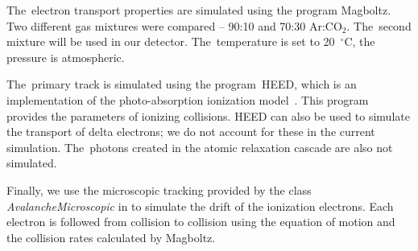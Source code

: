 		The~electron transport properties are simulated using the program Magboltz. Two different gas mixtures were compared -- 90:10 and 70:30 Ar:CO$_2$. The~second mixture will be used in our detector. The~temperature is set to 20~$^\circ$C, the pressure is atmospheric.
		
		The~primary track is simulated using the program~\ac{HEED}, which is an implementation of the photo-absorption ionization model~\cite{HEED}. This program provides the parameters of ionizing collisions. \ac{HEED} can also be used to simulate the transport of delta electrons; we do not account for these in the current simulation. The~photons created in the atomic relaxation cascade are also not simulated.
		
		Finally, we use the microscopic tracking provided by the class \textit{AvalancheMicroscopic} in \garfieldpp to simulate the drift of the ionization electrons. Each electron is followed from collision to collision using the equation of motion and the collision rates calculated by Magboltz.
		
		
